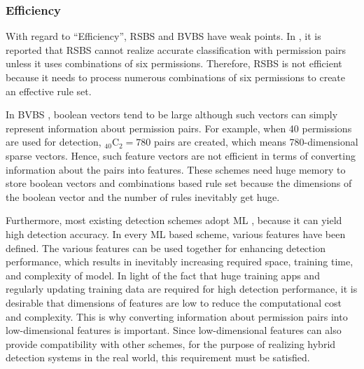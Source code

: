 \documentclass{ieeeaccess}
\begin{document}
\subsubsection{Efficiency}
With regard to ``Efficiency'', RSBS \cite{liang2014permission} and BVBS \cite{liu2014two} have weak points.
In \cite{liang2014permission}, it is reported that RSBS cannot realize accurate classification with permission pairs unless it uses combinations of six permissions.
Therefore, RSBS is not efficient because it needs to process numerous combinations of six permissions to create an effective rule set. 

In BVBS \cite{liu2014two}, boolean vectors tend to be large although such vectors can simply represent information about permission pairs.
For example, when 40 permissions are used for detection, ${}_{40}\mathrm{C}_2 = 780$ pairs are created, which means 780-dimensional sparse vectors.
Hence, such feature vectors are not efficient in terms of converting information about the pairs into features.
These schemes need huge memory to store boolean vectors and combinations based rule set because the dimensions of the boolean vector and the number of rules inevitably get huge.  

Furthermore, most existing detection schemes adopt ML \cite{wang2018detecting, garg2017network, aafer2013droidapiminer, xu2016iccdetector, cai2018droidcat, sanz2013puma, li2018significant, liu2014two}, because it can yield high detection accuracy.
In every ML based scheme, various features have been defined.
The various features can be used together for enhancing detection performance, which results in inevitably increasing required space, training time, and complexity of model.
In light of the fact that huge training apps and regularly updating training data are required for high detection performance, it is desirable that dimensions of features are low to reduce the computational cost and complexity.
This is why converting information about permission pairs into low-dimensional features is important.
Since low-dimensional features can also provide compatibility with other schemes, for the purpose of realizing hybrid detection systems in the real world, this requirement must be satisfied.
\end{document}
